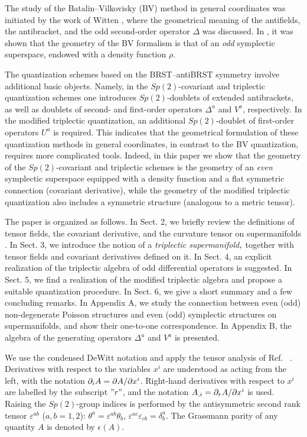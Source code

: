 \documentclass[a4paper,11pt]{article}
\begin{document}
The study of the Batalin--Vilkovisky (BV) method \cite{bv} in general
coordinates was initiated by the work of Witten \cite{w}, where the
geometrical meaning of the antifields, the antibracket, and the odd
second-order operator $\Delta $ was discussed. In \cite{geom}, it was shown
that the geometry of the BV formalism is that of an \textit{odd} symplectic
superspace, endowed with a density function $\rho $.

The quantization schemes based on the BRST--antiBRST symmetry involve
additional basic objects. Namely, in the $Sp(2)$-covariant and triplectic
quantization schemes one introduces $Sp(2)$-doublets of extended
antibrackets, as well as doublets of second- and first-order operators $%
\Delta ^{a}$ and $V^{a}$, respectively. In the modified triplectic
quantization, an additional $Sp(2)$-doublet of first-order operators $U^{a}$
is required. This indicates that the geometrical formulation of these
quantization methods in general coordinates, in contrast to the BV
quantization, requires more complicated tools. Indeed, in this paper we show
that the geometry of the $Sp(2)$-covariant and triplectic schemes is the
geometry of an \textit{even} symplectic superspace equipped with a density
function and a flat symmetric connection (covariant derivative), while the
geometry of the modified triplectic quantization also includes a symmetric
structure (analogous to a metric tensor).

The paper is organized as follows. In Sect. 2, we briefly review
the definitions of tensor fields, the covariant derivative, and
the curvature tensor on supermanifolds \cite{DeWitt}. In Sect. 3,
we introduce the notion of a \emph{triplectic
supermanifold}$\emph{,}$ together with tensor fields and covariant
derivatives defined on it. In Sect. 4, an explicit realization of
the triplectic algebra of odd differential operators is suggested.
In Sect. 5, we find a realization of the modified triplectic
algebra and propose a suitable quantization procedure. In Sect. 6,
we give a short summary and a few concluding remarks. In Appendix
A, we study the connection between even (odd) non-degenerate
Poisson structures and even (odd) symplectic structures on
supermanifolds, and show their one-to-one correspondence. In
Appendix B, the algebra of the generating operators $\Delta ^{a}$
and $V^{a}$ is presented.

We use the condensed DeWitt notation and apply the tensor analysis of Ref.~
\cite{DeWitt}. Derivatives with respect to the variables $x^{i}$ are
understood as acting from the left, with the notation $\partial _{i}A={%
\partial A}/{\partial x^{i}}$. Right-hand derivatives with respect
to $x^{i}$ are labelled by the subscript $"r"$, and the notation $A_{,i}={%
\partial _{r}A}/{\partial x^{i}}$ is used. Raising the $Sp(2)$-group indices
is performed by the antisymmetric second rank tensor $\varepsilon ^{ab}$ ($%
a,b=1,2$): $\theta ^{a}=\varepsilon ^{ab}\theta _{b}$, $\varepsilon
^{ac}\varepsilon _{cb}=\delta _{b}^{a}$. The Grassmann parity of any
quantity $A$ is denoted by $\epsilon (A)$.
\end{document}
